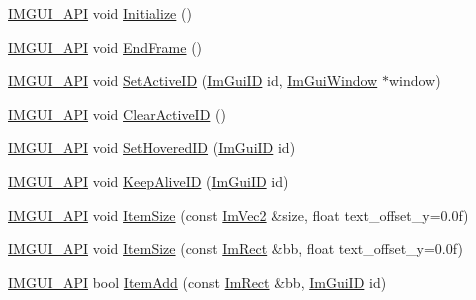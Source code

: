 \begin{DoxyCompactItemize}
\mbox{\hyperlink{imgui_8h_a43829975e84e45d1149597467a14bbf5}{I\+M\+G\+U\+I\+\_\+\+A\+PI}} void \mbox{\hyperlink{namespace_im_gui_a1a611da38fae18a3d1dafcb3228259da}{Initialize}} ()
\item 
\mbox{\hyperlink{imgui_8h_a43829975e84e45d1149597467a14bbf5}{I\+M\+G\+U\+I\+\_\+\+A\+PI}} void \mbox{\hyperlink{namespace_im_gui_a246c37da45e88a12ade440a0feacb4ee}{End\+Frame}} ()
\item 
\mbox{\hyperlink{imgui_8h_a43829975e84e45d1149597467a14bbf5}{I\+M\+G\+U\+I\+\_\+\+A\+PI}} void \mbox{\hyperlink{namespace_im_gui_a27b8ace13a8c421ee8405f0cbebe4ead}{Set\+Active\+ID}} (\mbox{\hyperlink{imgui_8h_a1785c9b6f4e16406764a85f32582236f}{Im\+Gui\+ID}} id, \mbox{\hyperlink{struct_im_gui_window}{Im\+Gui\+Window}} $\ast$window)
\item 
\mbox{\hyperlink{imgui_8h_a43829975e84e45d1149597467a14bbf5}{I\+M\+G\+U\+I\+\_\+\+A\+PI}} void \mbox{\hyperlink{namespace_im_gui_a17ff60ad1e2669130ac38a04d16eb354}{Clear\+Active\+ID}} ()
\item 
\mbox{\hyperlink{imgui_8h_a43829975e84e45d1149597467a14bbf5}{I\+M\+G\+U\+I\+\_\+\+A\+PI}} void \mbox{\hyperlink{namespace_im_gui_aba1f0c75d6f98702e6b02eb1bc30d915}{Set\+Hovered\+ID}} (\mbox{\hyperlink{imgui_8h_a1785c9b6f4e16406764a85f32582236f}{Im\+Gui\+ID}} id)
\item 
\mbox{\hyperlink{imgui_8h_a43829975e84e45d1149597467a14bbf5}{I\+M\+G\+U\+I\+\_\+\+A\+PI}} void \mbox{\hyperlink{namespace_im_gui_a85a245c78a9f7c351636bdad6e60c488}{Keep\+Alive\+ID}} (\mbox{\hyperlink{imgui_8h_a1785c9b6f4e16406764a85f32582236f}{Im\+Gui\+ID}} id)
\item 
\mbox{\hyperlink{imgui_8h_a43829975e84e45d1149597467a14bbf5}{I\+M\+G\+U\+I\+\_\+\+A\+PI}} void \mbox{\hyperlink{namespace_im_gui_ac7b9a7399d9606b25278002303f545b6}{Item\+Size}} (const \mbox{\hyperlink{struct_im_vec2}{Im\+Vec2}} \&size, float text\+\_\+offset\+\_\+y=0.\+0f)
\item 
\mbox{\hyperlink{imgui_8h_a43829975e84e45d1149597467a14bbf5}{I\+M\+G\+U\+I\+\_\+\+A\+PI}} void \mbox{\hyperlink{namespace_im_gui_a97b821f022e36964b40973fe1ff4367b}{Item\+Size}} (const \mbox{\hyperlink{struct_im_rect}{Im\+Rect}} \&bb, float text\+\_\+offset\+\_\+y=0.\+0f)
\item 
\mbox{\hyperlink{imgui_8h_a43829975e84e45d1149597467a14bbf5}{I\+M\+G\+U\+I\+\_\+\+A\+PI}} bool \mbox{\hyperlink{namespace_im_gui_a454e81b7c3befcc51c900f2fb3bd5a9a}{Item\+Add}} (const \mbox{\hyperlink{struct_im_rect}{Im\+Rect}} \&bb, \mbox{\hyperlink{imgui_8h_a1785c9b6f4e16406764a85f32582236f}{Im\+Gui\+ID}} id)

\end{DoxyCompactItemize}
